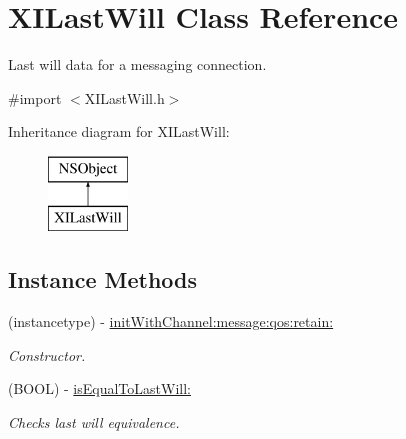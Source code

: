 \hypertarget{class_x_i_last_will}{}\section{X\+I\+Last\+Will Class Reference}
\label{class_x_i_last_will}


Last will data for a messaging connection.  




{\ttfamily \#import $<$X\+I\+Last\+Will.\+h$>$}

Inheritance diagram for X\+I\+Last\+Will\+:\begin{figure}[H]
\begin{center}
\leavevmode
\includegraphics[height=2.000000cm]{class_x_i_last_will}
\end{center}
\end{figure}
\subsection*{Instance Methods}
\begin{DoxyCompactItemize}
\item 
(instancetype) -\/ \hyperlink{class_x_i_last_will_ac5464f614e5d20f9ff9b0ab7623b7115}{init\+With\+Channel\+:message\+:qos\+:retain\+:}
\begin{DoxyCompactList}\small\item\em Constructor. \end{DoxyCompactList}\item 
(B\+O\+OL) -\/ \hyperlink{class_x_i_last_will_ab3f5d0887dc1cb7a17de8ed23e1c2435}{is\+Equal\+To\+Last\+Will\+:}
\begin{DoxyCompactList}\small\item\em Checks last will equivalence. \end{DoxyCompactList}\end{DoxyCompactItemize}
